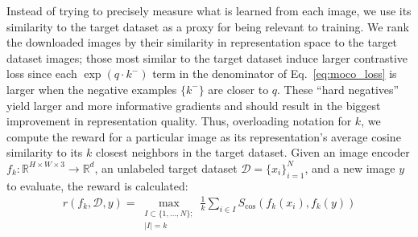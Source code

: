 Instead of trying to precisely measure what is learned from each image, we use its similarity to the target dataset as a proxy for being relevant to training.
We rank the downloaded images by their similarity in representation space to the target dataset images; those most similar to the target dataset induce larger contrastive loss since each $\exp(q \cdot k^-)$ term in the denominator of Eq.~\ref{eq:moco_loss} is larger when the negative examples $\{k^-\}$ are closer to $q$.
These ``hard negatives''~\cite{robinson2020contrastive,schroff2015facenet,oh2016deep,harwood2017smart,wu2017sampling,ge2018deep} yield larger and more informative gradients and should result in the biggest improvement in representation quality.
Thus, overloading notation for $k$, we compute the reward for a particular image as its representation's average cosine similarity to its $k$ closest neighbors in the target dataset. Given an image encoder $f_k: \mathbb{R}^{H\times W\times 3} \rightarrow \mathbb{R}^d$, an unlabeled target dataset $\mathcal D = \{ x_i\}_{i=1}^N$, and a new image $y$ to evaluate, the reward is calculated:
\begin{align}
    r(f_k, \mathcal D, y) = \max_{\substack{I \subset \{1, ..., N\}; \\ |I| = k}}\frac{1}{k} \sum_{i \in I} S_{\cos}(f_k(x_i), f_k(y))
\end{align}
